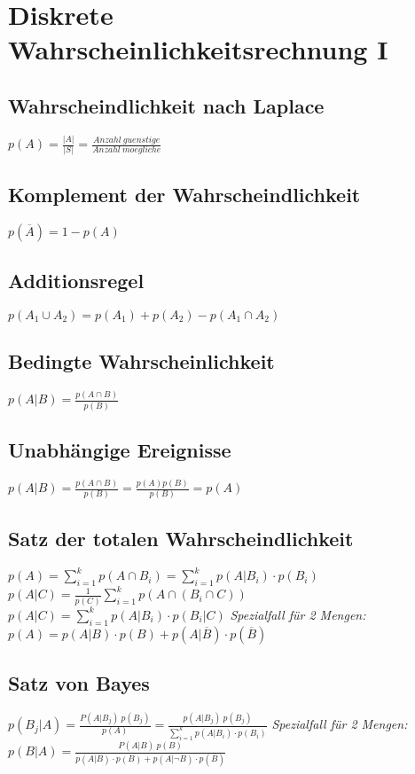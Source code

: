 \section{Diskrete Wahrscheinlichkeitsrechnung I}

\subsection{Wahrscheindlichkeit nach Laplace}
$ p(A) = \frac{|A|}{|S|} = \frac{Anzahl\ guenstige}{Anzahl\ moegliche}$

\subsection{Komplement der Wahrscheindlichkeit}
$ p(\overline{A}) = 1 - p(A) $

\subsection{Additionsregel}
$ p(A_1 \cup A_2 ) = p(A_1) + p(A_2) - p(A_1 \cap A_2) $

\subsection{Bedingte Wahrscheinlichkeit}
$ p(A|B) = \frac{p(A \cap B)}{p(B)} $

\subsection{Unabhängige Ereignisse}
$ p(A|B) = \frac{p(A \cap B)}{p(B)} = \frac{p(A) p(B)}{p(B)} = p(A) $

\subsection{Satz der totalen Wahrscheindlichkeit}
$ p(A) = \sum_{i=1}^{k} p(A \cap B_i) = \sum_{i=1}^{k} p(A|B_i) \cdot p(B_i) $
\newline
$ p(A|C) = \frac{1}{p(C)} \sum_{i=1}^{k} p(A \cap (B_i \cap C)) $
\newline
$ p(A|C)= \sum_{i=1}^{k} p(A|B_i) \cdot p(B_i|C) $
\newline \newline
\textit{Spezialfall für 2 Mengen:}\newline
$ p(A) = p(A|B) \cdot p(B) + p(A|\overline{B}) \cdot p(\overline{B}) $

\subsection{Satz von Bayes}
$ p(B_j|A) = \frac{P(A|B_j)\ p(B_j)}{p(A)} = \frac{p(A|B_j)\ p(B_j)}{\sum_{i=1}^{k} p(A|B_i) \cdot p(B_i)} $
\newline \newline
\textit{Spezialfall für 2 Mengen:}\newline
$ p(B|A) = \frac{P(A|B)\ p(B)}{p(A|B) \cdot p(B) + p(A|\neg{B}) \cdot p(\overline{B})} $
